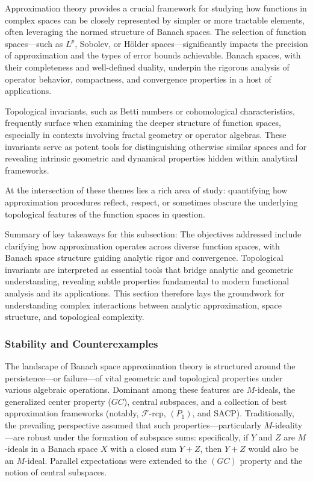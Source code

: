 \documentclass[sigconf]{acmart}
\begin{document}
Approximation theory provides a crucial framework for studying how functions in complex spaces can be closely represented by simpler or more tractable elements, often leveraging the normed structure of Banach spaces. The selection of function spaces---such as $L^p$, Sobolev, or Hölder spaces---significantly impacts the precision of approximation and the types of error bounds achievable. Banach spaces, with their completeness and well-defined duality, underpin the rigorous analysis of operator behavior, compactness, and convergence properties in a host of applications.

Topological invariants, such as Betti numbers or cohomological characteristics, frequently surface when examining the deeper structure of function spaces, especially in contexts involving fractal geometry or operator algebras. These invariants serve as potent tools for distinguishing otherwise similar spaces and for revealing intrinsic geometric and dynamical properties hidden within analytical frameworks.

At the intersection of these themes lies a rich area of study: quantifying how approximation procedures reflect, respect, or sometimes obscure the underlying topological features of the function spaces in question.

Summary of key takeaways for this subsection:
The objectives addressed include clarifying how approximation operates across diverse function spaces, with Banach space structure guiding analytic rigor and convergence. Topological invariants are interpreted as essential tools that bridge analytic and geometric understanding, revealing subtle properties fundamental to modern functional analysis and its applications. This section therefore lays the groundwork for understanding complex interactions between analytic approximation, space structure, and topological complexity.

\subsubsection{Stability and Counterexamples}

The landscape of Banach space approximation theory is structured around the persistence—or failure—of vital geometric and topological properties under various algebraic operations. Dominant among these features are $M$-ideals, the generalized center property ($GC$), central subspaces, and a collection of best approximation frameworks (notably, $\mathscr{F}$-rcp, $(P_1)$, and SACP). Traditionally, the prevailing perspective assumed that such properties—particularly $M$-ideality—are robust under the formation of subspace sums: specifically, if $Y$ and $Z$ are $M$-ideals in a Banach space $X$ with a closed sum $Y + Z$, then $Y + Z$ would also be an $M$-ideal. Parallel expectations were extended to the $(GC)$ property and the notion of central subspaces.
\end{document}
